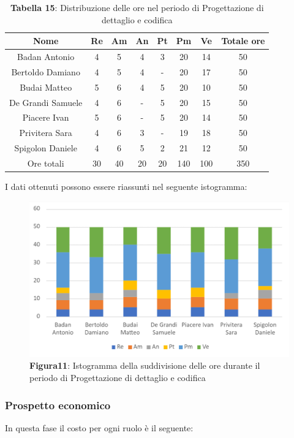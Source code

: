 \begin{table}[H]
	\centering
	\renewcommand{\arraystretch}{1.5}
	\begin{tabular}{|c|c|c|c|c|c|c|c|}
		\hline
		\rowcolor{lighter-grayer}
		Nome & Re & Am & An & Pt & Pm & Ve & Totale ore\\
		\hline
		Badan Antonio & 4 & 5 & 4 &  3 & 20 & 14 & 50 \\
		\hline
		Bertoldo Damiano & 4 & 5 & 4 & - & 20 & 17 & 50 \\
		\hline
		Budai Matteo & 5 & 6 & 4 & 5 & 20 & 10 & 50 \\
		\hline
		De Grandi Samuele & 4 & 6 & - & 5 & 20 & 15 & 50 \\
		\hline
		Piacere Ivan & 5 & 6 & - & 5 & 20 & 14 & 50 \\
		\hline
		Privitera Sara & 4 & 6 & 3 & - & 19 & 18 & 50 \\
		\hline
		Spigolon Daniele & 4 & 6 & 5 & 2 & 21 & 12 & 50 \\
		\hline
		Ore totali & 30 & 40 & 20 & 20 & 140 & 100 & 350 \\
		\hline
	\end{tabular}
	\caption*{\textbf{Tabella 15}: Distribuzione delle ore nel periodo di Progettazione di dettaglio e codifica\\}
\end{table}	
I dati ottenuti possono essere riassunti nel seguente istogramma:

\begin{figure}[H]
	\centering
	\includegraphics[width=0.7\linewidth]{res/images/IstogrammaFase3.png}
	\caption*{\textbf{Figura11}: Istogramma della suddivisione delle ore durante il periodo di Progettazione di dettaglio e codifica}
	\label{fig:Figura10}
\end{figure}


\subsubsection{Prospetto economico}
In questa fase il costo per ogni ruolo è il seguente:

